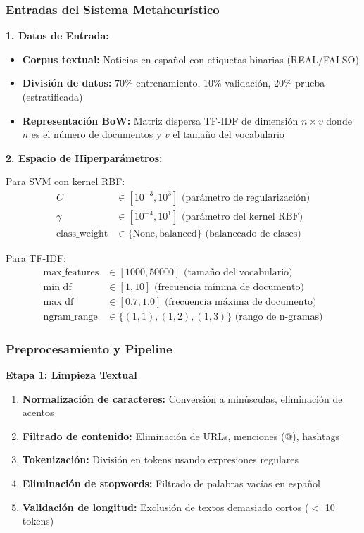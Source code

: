 \subsubsection{Entradas del Sistema Metaheurístico}

\textbf{1. Datos de Entrada:}
\begin{itemize}
    \item \textbf{Corpus textual:} Noticias en español con etiquetas binarias (REAL/FALSO)
    \item \textbf{División de datos:} 70\% entrenamiento, 10\% validación, 20\% prueba (estratificada)
    \item \textbf{Representación BoW:} Matriz dispersa TF-IDF de dimensión $n \times v$ donde $n$ es el número de documentos y $v$ el tamaño del vocabulario
\end{itemize}

\textbf{2. Espacio de Hiperparámetros:}

Para SVM con kernel RBF:
\begin{align}
C &\in [10^{-3}, 10^{3}] \text{ (parámetro de regularización)} \\
\gamma &\in [10^{-4}, 10^{1}] \text{ (parámetro del kernel RBF)} \\
\text{class\_weight} &\in \{\text{None}, \text{balanced}\} \text{ (balanceado de clases)}
\end{align}

Para TF-IDF:
\begin{align}
\text{max\_features} &\in [1000, 50000] \text{ (tamaño del vocabulario)} \\
\text{min\_df} &\in [1, 10] \text{ (frecuencia mínima de documento)} \\
\text{max\_df} &\in [0.7, 1.0] \text{ (frecuencia máxima de documento)} \\
\text{ngram\_range} &\in \{(1,1), (1,2), (1,3)\} \text{ (rango de n-gramas)}
\end{align}

\subsubsection{Preprocesamiento y Pipeline}

\textbf{Etapa 1: Limpieza Textual}
\begin{enumerate}
    \item \textbf{Normalización de caracteres:} Conversión a minúsculas, eliminación de acentos
    \item \textbf{Filtrado de contenido:} Eliminación de URLs, menciones (@), hashtags
    \item \textbf{Tokenización:} División en tokens usando expresiones regulares
    \item \textbf{Eliminación de stopwords:} Filtrado de palabras vacías en español
    \item \textbf{Validación de longitud:} Exclusión de textos demasiado cortos ($<$ 10 tokens)
\end{enumerate}

